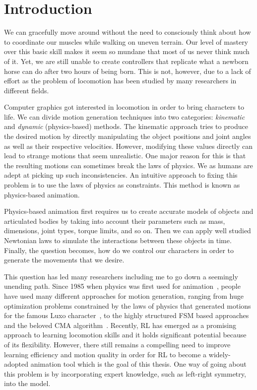 
\chapter{Introduction}
\label{ch:Introduction}

We can gracefully move around without the need to consciously think about how to coordinate our muscles while walking on uneven terrain. Our level of mastery over this basic skill makes it seem so mundane that most of us never think much of it.
Yet, we are still unable to create controllers that replicate what a newborn horse can do after two hours of being born. This is not, however, due to a lack of effort as the problem of locomotion has been studied by many researchers in different fields.

Computer graphics got interested in locomotion in order to bring characters to life. We can divide motion generation techniques into two categories: \textit{kinematic} and \textit{dynamic} (physics-based) methods.
The kinematic approach tries to produce the desired motion by directly manipulating the object positions and joint angles as well as their respective velocities.
However, modifying these values directly can lead to strange motions that seem unrealistic. One major reason for this is that the resulting motions can sometimes break the laws of physics. We as humans are adept at picking up such inconsistencies.
An intuitive approach to fixing this problem is to use the laws of physics as constraints. This method is known as physics-based animation.


Physics-based animation first requires us to create accurate models of objects and articulated bodies by taking into account their parameters such as mass, dimensions, joint types, torque limits, and so on. Then we can apply well studied Newtonian laws to simulate the interactions between these objects in time. Finally, the question becomes, how do we control our characters in order to generate the movements that we desire.

This question has led many researchers including me to go down a seemingly unending path.
Since 1985 when physics was first used for animation~\cite{Armstrong1985}, people have used many different approaches for motion generation, ranging from huge optimization problems constrained by the laws of physics that generated motions for the famous Luxo character~\cite{spacetime_constraints_luxo}, to the highly structured \acs{FSM} based approaches~\cite{Yin07} and the beloved CMA algorithm~\cite{Hansen06}. 
Recently, \ac{RL} has emerged as a promising approach to learning locomotion skills and it holds significant potential because of its flexibility.
However, there still remains a compelling need to improve learning efficiency and motion quality in order for \ac{RL} to become a widely-adopted animation tool which is the goal of this thesis.
One way of going about this problem is by incorporating expert knowledge, such as left-right symmetry, into the model.


